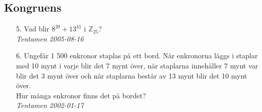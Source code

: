 \documentclass{article}
\begin{document}
\subsection*{Kongruens}
\begin{enumerate}

\item[5.]
Vad blir $8^{20}+13^{41}$ i $\mathbb{Z}_{25}$?\\

{\it Tentamen 2005-08-16}

\item[6.]
Ungefär 1 500 enkronor staplas på ett bord. När enkronorna läggs i staplar med 
10 mynt i varje blir det 7 mynt över, när staplarna innehåller 7 mynt var blir 
det 3 mynt över och när staplarna består av 13 mynt blir det 10 mynt över.\\
Hur många enkronor finns det på bordet?\\

{\it Tentamen 2002-01-17}

\end{enumerate}
\end{document}
